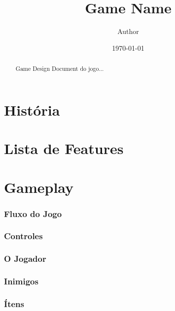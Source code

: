 \documentclass[11pt]{article}
\begin{document}

\title{Game Name}
\author{Author}
\date{\today}
\maketitle


\begin{abstract}
Game Design Document do jogo...
\end{abstract}



\tableofcontents






\part{História}





\part{Lista de Features}

\part{Gameplay}

\section{Fluxo do Jogo}

\section{Controles}

\section{O Jogador}

\section{Inimigos}

\section{Ítens}
\end{document}
